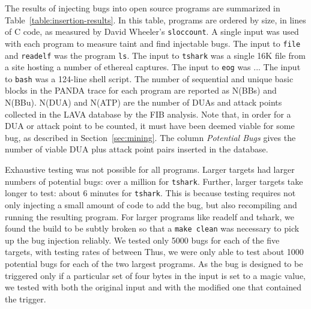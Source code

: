 The results of injecting bugs into open source programs are summarized in Table~\ref{table:insertion-results}.
In this table, programs are ordered by size, in lines of C code, as measured by David Wheeler's \verb+sloccount+. 
A single input was used with each program to measure taint and find injectable bugs.
The input to \verb+file+ and \verb+readelf+ was the program \verb+ls+.
The input to \verb+tshark+ was a single 16K file from a site hosting a number of ethereal captures. %
The input to \verb+eog+ was ... 
The input to \verb+bash+ was a 124-line shell script.
The number of sequential and unique basic blocks in the PANDA trace for each program are reported as N(BBs) and N(BBu).
N(DUA) and N(ATP) are the number of DUAs and attack points collected in the LAVA database by the FIB analysis.
Note that, in order for a DUA or attack point to be counted, it must have been deemed viable for some bug, as described in Section~\ref{sec:mining}.
The column \emph{Potential Bugs} gives the number of viable DUA plus attack point pairs inserted in the database.

Exhaustive testing was not possible for all programs.  
Larger targets had larger numbers of potential bugs: over a million for \verb+tshark+.
Further, larger targets take longer to test: about 6 minutes for \verb+tshark+.
This is because testing requires not only injecting a small amount of code to add the bug, but also recompiling and running the resulting program.
For larger programs like readelf and tshark, we found the build to be subtly broken so that a \verb+make clean+ was necessary to pick up the bug injection reliably.
We tested only 5000 bugs for each of the five targets, with testing rates of between 
Thus, we were only able to test about 1000 potential bugs for each of the two largest programs. 
As the bug is designed to be triggered only if a particular set of four bytes in the input is set to a magic value, we tested with both the original input and with the modified one that contained the trigger. 

